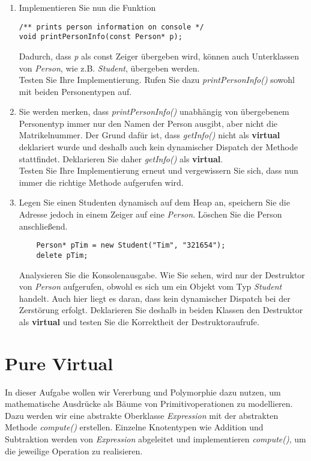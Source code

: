 \documentclass[
  accentcolor=tud1c,	%
  colorbacktitle,		%
  inverttitle,			%
  german,				%
  twoside
]{tudexercise}
\begin{document}
\begin{enumerate}
\item Implementieren Sie nun die Funktion 
\begin{lstlisting}
/** prints person information on console */
void printPersonInfo(const Person* p);
\end{lstlisting}

Dadurch, dass \emph{p} als const Zeiger übergeben wird, können auch Unterklassen von \emph{Person}, wie z.B. \emph{Student}, übergeben werden. \\

Testen Sie Ihre Implementierung. Rufen Sie dazu \emph{printPersonInfo()} sowohl mit beiden Personentypen auf.

\item Sie werden merken, dass \emph{printPersonInfo()} unabhängig von übergebenem Personentyp immer nur den Namen der Person ausgibt, aber nicht die Matrikelnummer. Der Grund dafür ist, dass \emph{getInfo()} nicht als \textbf{virtual} deklariert wurde und deshalb auch kein dynamischer Dispatch der Methode stattfindet. Deklarieren Sie daher \emph{getInfo()} als \textbf{virtual}. \\

Testen Sie Ihre Implementierung erneut und vergewissern Sie sich, dass nun immer die richtige Methode aufgerufen wird.

\item Legen Sie einen Studenten dynamisch auf dem Heap an, speichern Sie die Adresse jedoch in einem Zeiger auf eine \emph{Person}. Löschen Sie die Person anschließend.
\begin{lstlisting}
	Person* pTim = new Student("Tim", "321654");
	delete pTim;
\end{lstlisting}

Analysieren Sie die Konsolenausgabe. Wie Sie sehen, wird nur der Destruktor von \emph{Person} aufgerufen, obwohl es sich um ein Objekt vom Typ \emph{Student} handelt. Auch hier liegt es daran, dass kein dynamischer Dispatch bei der Zerstörung erfolgt. Deklarieren Sie deshalb in beiden Klassen den Destruktor als \textbf{virtual} und testen Sie die Korrektheit der Destruktoraufrufe.

\end{enumerate}


\section{Pure Virtual}
In dieser Aufgabe wollen wir Vererbung und Polymorphie dazu nutzen, um mathematische Ausdrücke als Bäume von Primitivoperationen zu modellieren. Dazu werden wir eine abstrakte Oberklasse \emph{Expression} mit der abstrakten Methode \emph{compute()} erstellen. Einzelne Knotentypen wie Addition und Subtraktion werden von \emph{Expression} abgeleitet und implementieren \emph{compute()}, um die jeweilige Operation zu realisieren.
\end{document}
